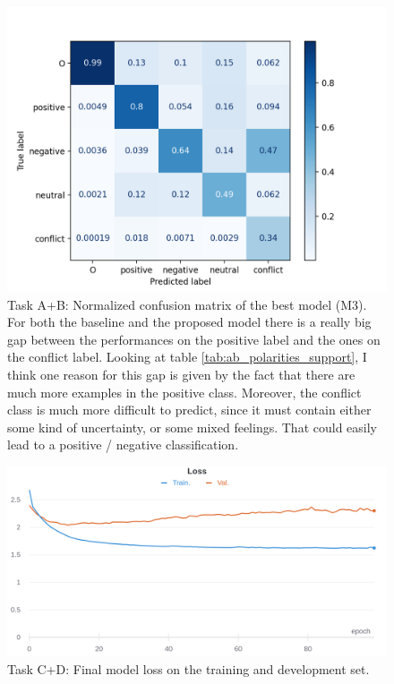 \documentclass[11pt,a4paper]{article}
\begin{document}
	\begin{figure}[H]
		\centering
		\includegraphics[width=1\columnwidth]{M3_ab_confusion_matrix.png}
		\caption{Task A+B: Normalized confusion matrix of the best model (M3). For both the baseline and the proposed model there is a really big gap between the performances on the positive label and the ones on the conflict label. Looking at table \ref{tab:ab_polarities_support}, I think one reason for this gap is given by the fact that there are much more examples in the positive class. Moreover, the conflict class is much more difficult to predict, since it must contain either some kind of uncertainty, or some mixed feelings. That could easily lead to a positive / negative classification.}
		\label{fig:cm_M3}
	\end{figure}

	\begin{figure}[H]
		\centering
		\includegraphics[width=1\columnwidth]{M3_cd_loss.png}
		\caption{Task C+D: Final model loss on the training and development set.}
		\label{fig:cd_loss}
	\end{figure}
\end{document}
